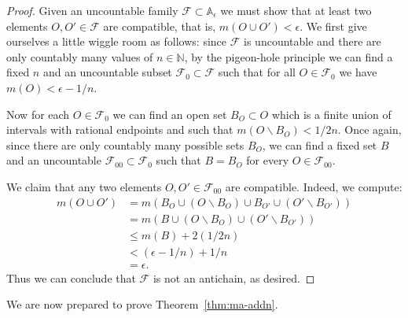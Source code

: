 \documentclass[11pt,oneside,a4paper]{amsbook}
\newcommand{\N}{\mathbb N}
\theoremstyle{definition}
\theoremstyle{plain}
\theoremstyle{definition}
\theoremstyle{remark}
\numberwithin{equation}{section}
\numberwithin{figure}{section}
\begin{document}
\begin{proof}
  Given an uncountable family $\mathcal F\subset\mathbb A_\epsilon$ we must show that at least two elements $O,O'\in\mathcal F$ are compatible, that is, $m(O\cup O')<\epsilon$. We first give ourselves a little wiggle room as follows: since $\mathcal F$ is uncountable and there are only countably many values of $n\in\N$, by the pigeon-hole principle we can find a fixed $n$ and an uncountable subset $\mathcal F_0\subset\mathcal F$ such that for all $O\in\mathcal F_0$ we have $m(O)<\epsilon-1/n$.

  Now for each $O\in\mathcal F_0$ we can find an open set $B_O\subset O$ which is a finite union of intervals with rational endpoints and such that $m(O\smallsetminus B_O)<1/2n$. Once again, since there are only countably many possible sets $B_O$, we can find a fixed set $B$ and an uncountable $\mathcal F_{00}\subset\mathcal F_0$ such that $B=B_O$ for every $O\in\mathcal F_{00}$.

  We claim that any two elements $O,O'\in\mathcal F_{00}$ are compatible. Indeed, we compute:
  \begin{align*}
    m(O\cup O')&=m(B_O\cup(O\smallsetminus B_O)\cup B_{O'}\cup(O'\smallsetminus B_{O'}))\\
    &=m(B\cup(O\smallsetminus B_O)\cup(O'\smallsetminus B_{O'}))\\
    &\leq m(B)+2(1/2n)\\
    &<(\epsilon-1/n)+1/n\\
    &=\epsilon\text{.}
  \end{align*}
  Thus we can conclude that $\mathcal F$ is not an antichain, as desired.
\end{proof}

We are now prepared to prove Theorem~\ref{thm:ma-addn}.
\end{document}
